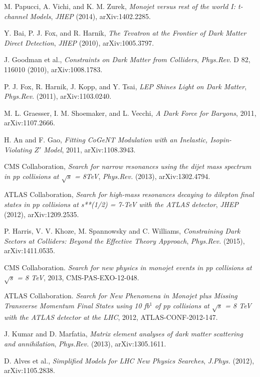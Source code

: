 M. Papucci, A. Vichi, and K. M. Zurek, \emph{Monojet versus rest of the world I: t-channel Models}, \emph{JHEP} (2014), arXiv:1402.2285.

Y. Bai, P. J. Fox, and R. Harnik, \emph{The Tevatron at the Frontier of Dark Matter Direct Detection}, \emph{JHEP} (2010), arXiv:1005.3797.

J. Goodman et al., \emph{Constraints on Dark Matter from Colliders}, \emph{Phys.Rev.} D 82, 116010 (2010), arXiv:1008.1783.

P. J. Fox, R. Harnik, J. Kopp, and Y. Tsai, \emph{LEP Shines Light on Dark Matter}, \emph{Phys.Rev.} (2011), arXiv:1103.0240.

M. L. Graesser, I. M. Shoemaker, and L. Vecchi, \emph{A Dark Force for Baryons}, 2011, arXiv:1107.2666.

H. An and F. Gao, \emph{Fitting CoGeNT Modulation with an Inelastic, Isopin-Violating $Z'$ Model}, 2011, arXiv:1108.3943.

CMS Collaboration, \emph{
Search for narrow resonances using the dijet mass spectrum in pp collisions at $\sqrt{s}$ = 8TeV}, \emph{Phys.Rev.} (2013), arXiv:1302.4794.

ATLAS Collaboration, \emph{Search for high-mass resonances decaying to dilepton final states in pp collisions at s**(1/2) = 7-TeV with the ATLAS detector}, \emph{JHEP} (2012), arXiv:1209.2535.

P. Harris, V. V. Khoze, M. Spannowsky and C. Williams, \emph{Constraining Dark Sectors at Colliders: Beyond the Effective Theory Approach}, \emph{Phys.Rev.} (2015), arXiv:1411.0535.

CMS Collaboration. \emph{Search for new physics in monojet events in pp collisions at $\sqrt{s}$ = 8 TeV}, 2013, CMS-PAS-EXO-12-048.

ATLAS Collaboration. \emph{Search for New Phenomena in Monojet plus Missing Transverse Momentum Final States using 10 fb$^{1}$ of pp collisions at $\sqrt{s}$ = 8 TeV with the ATLAS detector at the LHC}, 2012, ATLAS-CONF-2012-147.

J. Kumar and D. Marfatia, \emph{Matrix element analyses of dark matter scattering and annihilation}, \emph{Phys.Rev.} (2013), arXiv:1305.1611.

D. Alves et al., \emph{Simplified Models for LHC New Physics Searches}, \emph{J.Phys.} (2012), arXiv:1105.2838.

